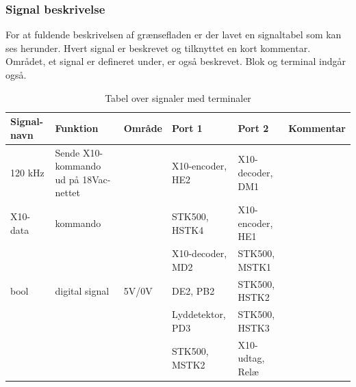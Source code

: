 \begin{table}[H]
\subsubsection{Signal beskrivelse}
For at fuldende beskrivelsen af grænsefladen er der lavet en signaltabel som kan ses herunder. Hvert signal er beskrevet og tilknyttet en kort kommentar. Området, et signal er defineret under, er også beskrevet. Blok og terminal indgår også. 
\caption{Tabel over signaler med terminaler}
\begin{small}
\begin{tabular}{|p{2cm}|p{2cm}|p{2cm}|p{2cm}|p{2cm}|p{}|}
\hline
\textbf{Signal-navn} & \textbf{Funktion} & \textbf{Område} & \textbf{Port 1} & \textbf{Port 2} & \textbf{Kommentar} \\ \hline

120 kHz & Sende X10-kommando ud på 18Vac-nettet & & X10-encoder, HE2 & X10-decoder, DM1 & \\ \hline

X10-data & kommando & & STK500, HSTK4 & X10-encoder, HE1 & \\ \cline{4-5}
&&& X10-decoder, MD2 & STK500, MSTK1 &\\ \hline

bool & digital signal & 5V/0V & DE2, PB2 & STK500, HSTK2 & \\ \cline{4-5}
&&& Lyddetektor, PD3 & STK500, HSTK3 & \\ \cline{4-5}
&&& STK500, MSTK2 & X10-udtag, Relæ & \\ \hline
\end{tabular}
\end{small}
\label{table:Signaltabel}
\end{table}


